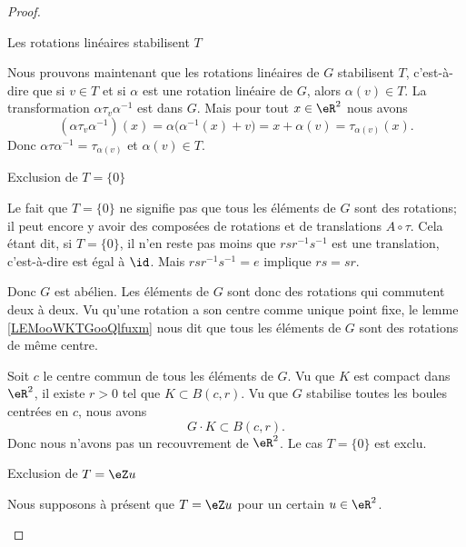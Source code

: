 \begin{proof}
\begin{subproof}
        \item[Les rotations linéaires stabilisent \( T\)]

            Nous prouvons maintenant que les rotations linéaires de \( G\) stabilisent \( T\), c'est-à-dire que si \( v\in T\) et si \( \alpha\) est une rotation linéaire de \( G\), alors \( \alpha(v)\in T\). La transformation \( \alpha\tau_v\alpha^{-1}\) est dans \( G\). Mais pour tout \( x\in \eR^2\) nous avons
            \begin{equation}        \label{EQooLLZVooUuabir}
                (\alpha\tau_v\alpha^{-1})(x)=\alpha\big( \alpha^{-1}(x)+v \big)=x+\alpha(v)=\tau_{\alpha(v)}(x).
            \end{equation}
            Donc \( \alpha\tau\alpha^{-1}=\tau_{\alpha(v)}\) et \( \alpha(v)\in T\).
            
        \item[Exclusion de \( T=\{ 0 \}\)]

            Le fait que \( T=\{ 0 \}\) ne signifie pas que tous les éléments de \( G\) sont des rotations; il peut encore y avoir des composées de rotations et de translations \( A\circ \tau\). Cela étant dit, si \( T=\{ 0 \}\), il n'en reste pas moins que \( rsr^{-1}s^{-1}\) est une translation, c'est-à-dire est égal à \( \id\). Mais \( rsr^{-1}s^{-1}=e\) implique \( rs=sr\).

            Donc \( G\) est abélien. Les éléments de \( G\) sont donc des rotations qui commutent deux à deux. Vu qu'une rotation a son centre comme unique point fixe, le lemme \ref{LEMooWKTGooQlfuxm} nous dit que tous les éléments de \( G\) sont des rotations de même centre.

            Soit \( c\) le centre commun de tous les éléments de \( G\). Vu que \( K\) est compact dans \( \eR^2\), il existe \( r>0\) tel que \( K\subset B(c,r)\). Vu que \( G\) stabilise toutes les boules centrées en \( c\), nous avons
            \begin{equation}
                G\cdot K\subset B(c,r).
            \end{equation}
            Donc nous n'avons pas un recouvrement de \( \eR^2\). Le cas \( T=\{0  \}\) est exclu.

        \item[Exclusion de \( T=\eZ u\)]

            Nous supposons à présent que \( T=\eZ u\) pour un certain \( u\in \eR^2\). 


\end{subproof}
\end{proof}

